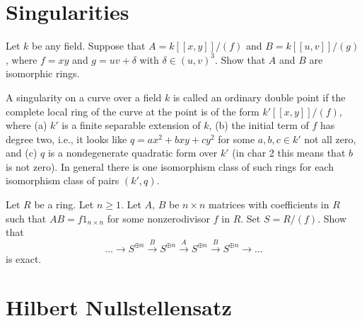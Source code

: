 \section{Singularities}
\label{section-singularities}

\begin{exercise}
\label{exercise-singularities}
Let $k$ be any field. Suppose that $A = k[[x, y]]/(f)$ and
$B = k[[u, v]]/(g)$, where $f = xy$ and $g = uv + \delta$ with
$\delta \in (u, v)^3$. Show that $A$ and $B$ are isomorphic rings.
\end{exercise}

\begin{remark}
\label{remark-singularities}
A singularity on a curve over a field $k$ is called an
ordinary double point if the complete local ring of the curve at the
point is of the form $k'[[x, y]]/(f)$, where (a) $k'$ is a finite separable
extension of $k$, (b) the initial term of $f$ has degree two, i.e., it
looks like $q = ax^2 + bxy + cy^2$ for some $a, b, c\in k'$ not all zero, and
(c) $q$ is a nondegenerate quadratic form over $k'$ (in char 2 this means that
$b$ is not zero). In general there is one isomorphism class of such rings for
each isomorphism class of pairs $(k', q)$.
\end{remark}

\begin{exercise}
\label{exercise-periodic-resolution}
Let $R$ be a ring. Let $n \geq 1$. Let $A$, $B$ be $n \times n$ matrices with
coefficients in $R$ such that $AB = f 1_{n \times n}$
for some nonzerodivisor $f$ in $R$. Set $S = R/(f)$. Show that
$$
\ldots \to
S^{\oplus n} \xrightarrow{B}
S^{\oplus n} \xrightarrow{A}
S^{\oplus n} \xrightarrow{B}
S^{\oplus n} \to \ldots
$$
is exact.
\end{exercise}






\section{Hilbert Nullstellensatz}
\label{section-Hilbert-Nullstellensatz}


